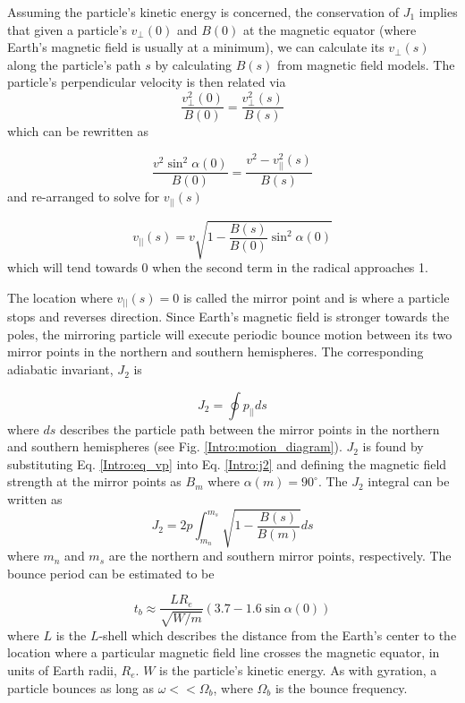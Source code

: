 Assuming the particle's kinetic energy is concerned, the conservation of $J_1$ implies that given a particle's $v_\perp(0)$ and $B(0)$ at the magnetic equator (where Earth's magnetic field is usually at a minimum), we can calculate its $v_\perp(s)$ along the particle's path $s$ by calculating $B(s)$ from magnetic field models. The particle's perpendicular velocity is then related via
\begin{equation}
\frac{v_\perp^2 (0)}{B(0)} = \frac{v_\perp^2 (s)}{B(s)}
\end{equation} which can be rewritten as 

\begin{equation}
\frac{v^2 \sin^2{\alpha(0)}}{B(0)} = \frac{v^2 - v^2_{||}(s)}{B(s)}
\end{equation} and re-arranged to solve for $v_{||}(s)$

\begin{equation} \label{Intro:eq_vp} 
v_{||}(s) = v \sqrt{1 - \frac{B(s)}{B(0)} \sin^2{\alpha(0)}}
\end{equation} which will tend towards 0 when the second term in the radical approaches 1.

The location where $v_{||}(s) = 0$ is called the mirror point and is where a particle stops and reverses direction. Since Earth's magnetic field is stronger towards the poles, the mirroring particle will execute periodic bounce motion between its two mirror points in the northern and southern hemispheres. The corresponding adiabatic invariant, $J_2$ is

\begin{equation} \label{Intro:j2}
J_2 = \oint p_{||} ds
\end{equation} where $ds$ describes the particle path between the mirror points in the northern and southern hemispheres (see Fig. \ref{Intro:motion_diagram}). $J_2$ is found by substituting Eq. \ref{Intro:eq_vp} into Eq. \ref{Intro:j2} and defining the magnetic field strength at the mirror points as $B_m$ where $\alpha(m) = 90^\circ$. The $J_2$ integral can be written as     
\begin{equation}
J_2 = 2 p \int_{m_n}^{m_s} \sqrt{1 - \frac{B(s)}{B(m)}} ds
\end{equation} where $m_n$ and $m_s$ are the northern and southern mirror points, respectively. The bounce period can be estimated \citep[e.g.][]{Baumjohann1997} to be 

\begin{equation}
t_b \approx \frac{L R_e}{\sqrt{W/m}} (3.7 - 1.6 \sin{\alpha(0)})
\end{equation} where $L$ is the $L$-shell which describes the distance from the Earth's center to the location where a particular magnetic field line crosses the magnetic equator, in units of Earth radii, $R_e$. $W$ is the particle's kinetic energy. As with gyration, a particle bounces as long as $\omega << \Omega_b$, where $\Omega_b$ is the bounce frequency.

